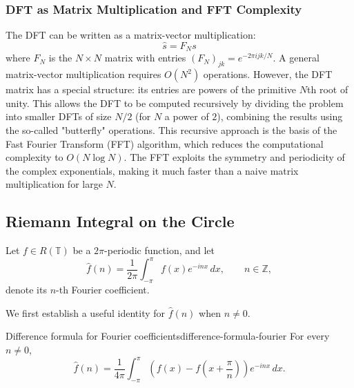 \subsubsection*{DFT as Matrix Multiplication and FFT Complexity}
The DFT can be written as a matrix-vector multiplication:
\[
    \hat{s} = F_N s
\]
where $F_N$ is the $N \times N$ matrix with entries $(F_N)_{jk} = e^{-2\pi i jk / N}$.
A general matrix-vector multiplication requires $O(N^2)$ operations. However, the DFT matrix has a special structure: its entries are powers of the primitive $N$th root of unity. This allows the DFT to be computed recursively by dividing the problem into smaller DFTs of size $N/2$ (for $N$ a power of $2$), combining the results using the so-called "butterfly" operations.
This recursive approach is the basis of the Fast Fourier Transform (FFT) algorithm, which reduces the computational complexity to $O(N \log N)$. The FFT exploits the symmetry and periodicity of the complex exponentials, making it much faster than a naive matrix multiplication for large $N$.
\subsection{Riemann Integral on the Circle}

Let \(f \in R(\mathbb{T})\) be a \(2\pi\)-periodic function, and let
\[
    \hat{f}(n)=\frac{1}{2\pi}\int_{-\pi}^{\pi} f(x)e^{-inx}\,dx,
    \qquad n\in\mathbb{Z},
\]
denote its \(n\)-th Fourier coefficient.

We first establish a useful identity for \(\hat{f}(n)\) when \(n\neq 0\).

\begin{proposition}{Difference formula for Fourier coefficients}{difference-formula-fourier}
    For every \(n\neq 0\),
    \begin{equation}
        \hat{f}(n)
        =
        \frac{1}{4\pi}\int_{-\pi}^{\pi}
        \left(f(x)-f\left(x+\frac{\pi}{n}\right)\right)e^{-inx}\,dx.
    \end{equation}
\end{proposition}

